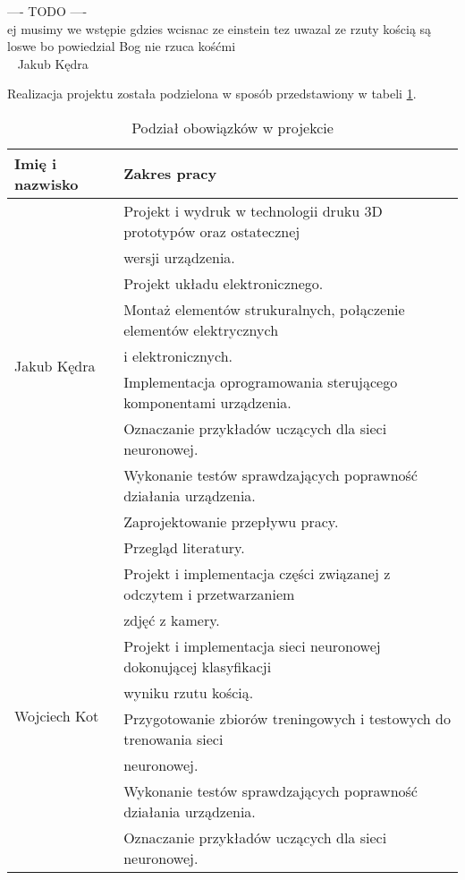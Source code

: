---- TODO ---- \\
ej musimy we wstępie gdzies wcisnac ze einstein tez uwazal ze rzuty kością są loswe bo powiedzial Bog nie rzuca kośćmi \\
~ Jakub Kędra

Realizacja projektu została podzielona w sposób przedstawiony w tabeli \ref{podzial}.

\begin{table} [H]
    \centering
    \caption{Podział obowiązków w projekcie}
    \label{podzial}
    \begin{tabular}{|l|l|}
        \hline
        Imię i nazwisko & Zakres pracy \\
        \hline
        \multirow{9}{*}{Jakub Kędra} 
            & Projekt i wydruk w technologii druku 3D prototypów oraz ostatecznej \\
            & wersji urządzenia. \\
            & Projekt układu elektronicznego. \\
            & Montaż elementów strukuralnych, połączenie elementów elektrycznych \\
            & i elektronicznych. \\
            & Implementacja oprogramowania sterującego komponentami urządzenia. \\
            & Oznaczanie przykładów uczących dla sieci neuronowej. \\
            & Wykonanie testów sprawdzających poprawność działania urządzenia. \\
            & Zaprojektowanie przepływu pracy. \\
            & Przegląd literatury. \\
        \hline
        \multirow{11}{*}{Wojciech Kot} 
            & Projekt i implementacja części związanej z odczytem i przetwarzaniem \\
            & zdjęć z kamery. \\
            & Projekt i implementacja sieci neuronowej dokonującej klasyfikacji \\
            & wyniku rzutu kością. \\
            & Przygotowanie zbiorów treningowych i testowych do trenowania sieci \\
            & neuronowej. \\
            & Wykonanie testów sprawdzających poprawność działania urządzenia. \\
            & Oznaczanie przykładów uczących dla sieci neuronowej. \\

\end{tabular}
\end{table}
